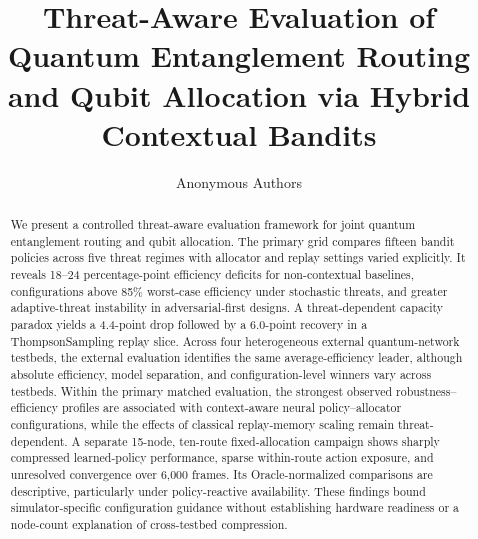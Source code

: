 \documentclass[10pt,journal]{IEEEtran}
\begin{document}
\title{Threat-Aware Evaluation of Quantum Entanglement Routing and Qubit Allocation via Hybrid Contextual Bandits}
\author{Anonymous Authors}
\maketitle

\begin{abstract}
We present a controlled threat-aware evaluation framework for joint quantum entanglement routing and qubit allocation. The primary grid compares fifteen bandit policies across five threat regimes with allocator and replay settings varied explicitly. It reveals 18--24 percentage-point efficiency deficits for non-contextual baselines, configurations above 85\% worst-case efficiency under stochastic threats, and greater adaptive-threat instability in adversarial-first designs. A threat-dependent capacity paradox yields a 4.4-point drop followed by a 6.0-point recovery in a ThompsonSampling replay slice. Across four heterogeneous external quantum-network testbeds, the external evaluation identifies the same average-efficiency leader, although absolute efficiency, model separation, and configuration-level winners vary across testbeds. Within the primary matched evaluation, the strongest observed robustness--efficiency profiles are associated with context-aware neural policy--allocator configurations, while the effects of classical replay-memory scaling remain threat-dependent. A separate 15-node, ten-route fixed-allocation campaign shows sharply compressed learned-policy performance, sparse within-route action exposure, and unresolved convergence over 6,000 frames. Its Oracle-normalized comparisons are descriptive, particularly under policy-reactive availability. These findings bound simulator-specific configuration guidance without establishing hardware readiness or a node-count explanation of cross-testbed compression.



\end{abstract}
\end{document}
